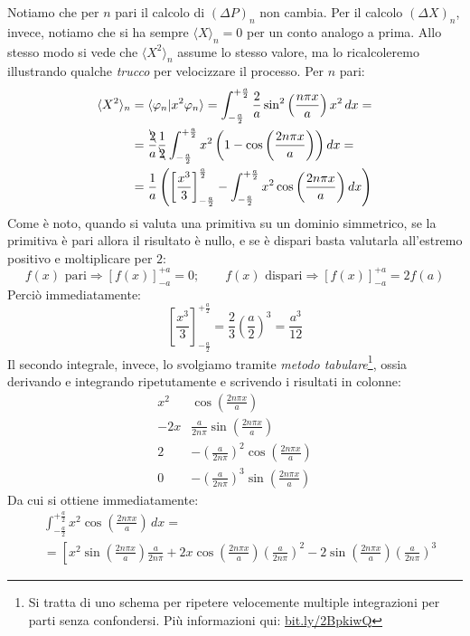 \documentclass[../../FisicaTeorica.tex]{subfiles}
\begin{document}
\begin{enumerate}
Notiamo che per $n$ pari il calcolo di $(\Delta P)_n$ non cambia. Per il calcolo $(\Delta X)_n$, invece, notiamo che si ha sempre $\langle X\rangle_n = 0$ per un conto analogo a prima. Allo stesso modo si vede che $\langle X^2 \rangle_n$ assume lo stesso valore, ma lo ricalcoleremo illustrando qualche \textit{trucco} per velocizzare il processo. Per $n$ pari:
\begin{align*}
\langle X^2\rangle_n &= \braket{\varphi_n | x^2 \varphi_n} = \int_{-\frac{a}{2}}^{+\frac{a}{2}} \frac{2}{a}\sin^2 \left(\frac{n\pi x}{a}\right) x^2\,dx=\\
&= \frac{\bcancel{2}}{a}\frac{1}{\bcancel{2}} \int_{-\frac{a}{2}}^{+\frac{a}{2}} x^2 \left(1-\cos\left(\frac{2n\pi x}{a}\right)\right)dx =\\
&= \frac{1}{a}\left(\left[\frac{x^3}{3}\right]_{-\frac{a}{2}}^{\frac{a}{2}}- \int_{-\frac{a}{2}}^{+\frac{a}{2}} x^2 \cos\left(\frac{2n\pi x}{a}\right) dx\right)
\end{align*}
Come è noto, quando si valuta una primitiva su un dominio simmetrico, se la primitiva è pari allora il risultato è nullo, e se è dispari basta valutarla all'estremo positivo e moltiplicare per $2$:
\[
f(x) \text{ pari} \Rightarrow [f(x)]_{-a}^{+a}=0; \qquad f(x) \text{ dispari}\Rightarrow [f(x)]_{-a}^{+a}=2f(a)
\]
Perciò immediatamente:
\[
\left[\frac{x^3}{3}\right]_{-\frac{a}{2}}^{+\frac{a}{2}}=\frac{2}{3}\left(\frac{a}{2}\right)^3=\frac{a^3}{12}
\]
Il secondo integrale, invece, lo svolgiamo tramite \textit{metodo tabulare}\footnote{Si tratta di uno schema per ripetere velocemente multiple integrazioni per parti senza confondersi. Più informazioni qui: \url{bit.ly/2BpkiwQ}}, ossia derivando e integrando ripetutamente e scrivendo i risultati in colonne:
\[
\begin{array}{c|c}
x^2 & \cos\left(\frac{2n\pi x}{a}\right)\\ \hline 
-2x & \frac{a}{2n\pi}\sin\left(\frac{2n\pi x}{a}\right)\\
2 & -\left(\frac{a}{2n\pi}\right)^2\cos\left(\frac{2n\pi x}{a}\right)\\
0 & -\left(\frac{a}{2n\pi}\right)^3 \sin\left(\frac{2n\pi x}{a}\right)
\end{array}
\]
Da cui si ottiene immediatamente:
\begin{align*}
&\int_{-\frac{a}{2}}^{+\frac{a}{2}} x^2 \cos\left(\frac{2n\pi x}{a}\right)\,dx = \\
&= \left[
x^2 \sin\left(\frac{2n\pi x}{a}\right)\frac{a}{2n\pi} + 2x \cos\left(\frac{2n\pi x}{a}\right)\left(\frac{a}{2n\pi}\right)^2-2\sin\left(\frac{2n\pi x}{a}\right)\left(\frac{a}{2n\pi}\right)^3

\end{align*}
\end{enumerate}
\end{document}
